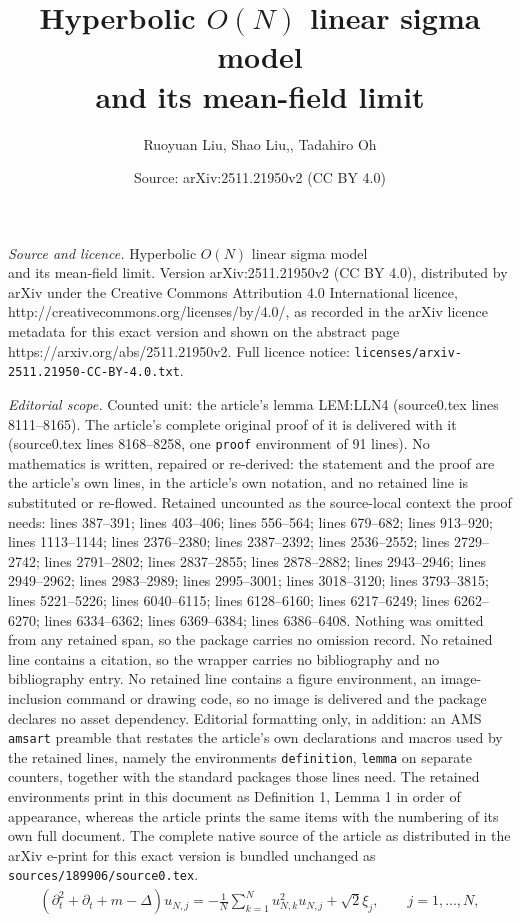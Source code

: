 \documentclass[10pt,a4paper]{amsart}
\title{Hyperbolic $O (N)$ linear sigma model\\ and its mean-field limit}
\author{Ruoyuan Liu, Shao Liu,, Tadahiro Oh}
\date{Source: arXiv:2511.21950v2 (CC BY 4.0)}
\newcommand{\Dl}{\Delta}
\newcommand{\dt}{\partial_t}
\begin{document}
\maketitle

\noindent\emph{Source and licence.} Hyperbolic $O (N)$ linear sigma model\\ and its mean-field limit. Version arXiv:2511.21950v2 (CC BY 4.0), distributed by arXiv under the Creative Commons Attribution 4.0 International licence, http://creativecommons.org/licenses/by/4.0/, as recorded in the arXiv licence metadata for this exact version and shown on the abstract page https://arxiv.org/abs/2511.21950v2. Full licence notice: \texttt{licenses/arxiv-2511.21950-CC-BY-4.0.txt}.\par\smallskip

\noindent\textit{Editorial scope.} Counted unit: the article's lemma LEM:LLN4 (source0.tex lines 8111--8165). The article's complete original proof of it is delivered with it (source0.tex lines 8168--8258, one \texttt{proof} environment of 91 lines). No mathematics is written, repaired or re-derived: the statement and the proof are the article's own lines, in the article's own notation, and no retained line is substituted or re-flowed.  Retained uncounted as the source-local context the proof needs: lines 387--391; lines 403--406; lines 556--564; lines 679--682; lines 913--920; lines 1113--1144; lines 2376--2380; lines 2387--2392; lines 2536--2552; lines 2729--2742; lines 2791--2802; lines 2837--2855; lines 2878--2882; lines 2943--2946; lines 2949--2962; lines 2983--2989; lines 2995--3001; lines 3018--3120; lines 3793--3815; lines 5221--5226; lines 6040--6115; lines 6128--6160; lines 6217--6249; lines 6262--6270; lines 6334--6362; lines 6369--6384; lines 6386--6408.  Nothing was omitted from any retained span, so the package carries no omission record.  No retained line contains a citation, so the wrapper carries no bibliography and no bibliography entry.  No retained line contains a figure environment, an image-inclusion command or drawing code, so no image is delivered and the package declares no asset dependency.  Editorial formatting only, in addition: an AMS \texttt{amsart} preamble that restates the article's own declarations and macros used by the retained lines, namely the environments \texttt{definition}, \texttt{lemma} on separate counters, together with the standard packages those lines need.  The retained environments print in this document as Definition 1, Lemma 1 in order of appearance, whereas the article prints the same items with the numbering of its own full document.  The complete native source of the article as distributed in the arXiv e-print for this exact version is bundled unchanged as \texttt{sources/189906/source0.tex}.
\begin{align}
    (\dt^2 + \dt + m - \Dl) u_{N, j} = - \frac 1N \sum_{k = 1}^N u_{N, k}^2 u_{N, j} + \sqrt{2} \xi_j,
\qquad j = 1, \dots, N, 
\label{NLW1}
\end{align}
\end{document}
